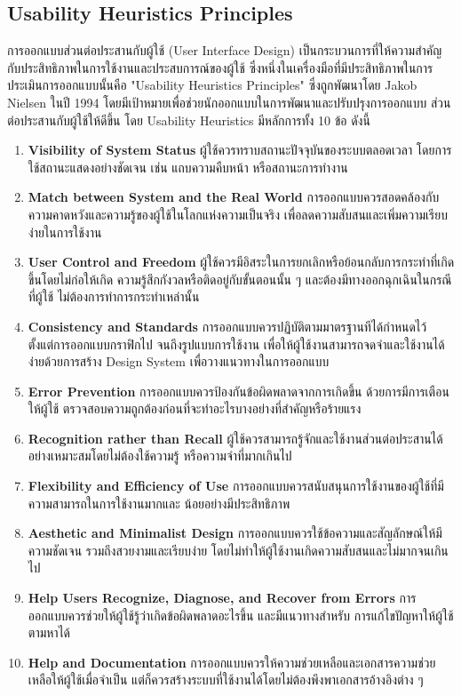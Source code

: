 \subsection{Usability Heuristics Principles}
การออกแบบส่วนต่อประสานกับผู้ใช้ (User Interface Design) 
เป็นกระบวนการที่ให้ความสำคัญกับประสิทธิภาพในการใช้งานและประสบการณ์ของผู้ใช้ 
ซึ่งหนึ่งในเครื่องมือที่มีประสิทธิภาพในการประเมินการออกแบบนั้นคือ 
"Usability Heuristics Principles" ซึ่งถูกพัฒนาโดย Jakob Nielsen  
ในปี 1994 โดยมีเป้าหมายเพื่อช่วยนักออกแบบในการพัฒนาและปรับปรุงการออกแบบ
ส่วนต่อประสานกับผู้ใช้ให้ดีขึ้น โดย Usability Heuristics มีหลักการทั้ง 10 ข้อ ดังนี้
\begin{enumerate}
    \item \textbf{Visibility of System Status} 
    ผู้ใช้ควรทราบสถานะปัจจุบันของระบบตลอดเวลา โดยการใช้สถานะแสดงอย่างชัดเจน 
    เช่น แถบความคืบหน้า หรือสถานะการทำงาน
    \item \textbf{Match between System and the Real World} 
    การออกแบบควรสอดคล้องกับความคาดหวังและความรู้ของผู้ใช้ในโลกแห่งความเป็นจริง 
    เพื่อลดความสับสนและเพิ่มความเรียบง่ายในการใช้งาน
    \item \textbf{User Control and Freedom} 
    ผู้ใช้ควรมีอิสระในการยกเลิกหรือย้อนกลับการกระทำที่เกิดขึ้นโดยไม่ก่อให้เกิด
    ความรู้สึกกังวลหรือติดอยู่กับขั้นตอนนั้น ๆ  และต้องมีทางออกฉุกเฉินในกรณีที่ผู้ใช้
    ไม่ต้องการทำการกระทำเหล่านั้น
    \item \textbf{Consistency and Standards} 
    การออกแบบควรปฏิบัติตามมาตรฐานทีได้กำหนดไว้ ตั้งแต่การออกแบบกราฟิกไป
    จนถึงรูปแบบการใช้งาน เพื่อให้ผู้ใช้งานสามารถจดจำและใช้งานได้ง่ายด้วยการสร้าง 
    Design System เพื่อวางแนวทางในการออกแบบ
    \item \textbf{Error Prevention} 
    การออกแบบควรป้องกันข้อผิดพลาดจากการเกิดขึ้น ด้วยการมีการเตือนให้ผู้ใช้
    ตรวจสอบความถูกต้องก่อนที่จะทำอะไรบางอย่างที่สำคัญหรือร้ายแรง
    \item \textbf{Recognition rather than Recall} 
    ผู้ใช้ควรสามารถรู้จักและใช้งานส่วนต่อประสานได้อย่างเหมาะสมโดยไม่ต้องใช้ความรู้
    หรือความจำที่มากเกินไป
    \item \textbf{Flexibility and Efficiency of Use} 
    การออกแบบควรสนับสนุนการใช้งานของผู้ใช้ที่มีความสามารถในการใช้งานมากและ
    น้อยอย่างมีประสิทธิภาพ
    \item \textbf{Aesthetic and Minimalist Design} 
    การออกแบบควรใช้ข้อความและสัญลักษณ์ให้มีความชัดเจน รวมถึงสวยงามและเรียบง่าย 
    โดยไม่ทำให้ผู้ใช้งานเกิดความสับสนและไม่มากจนเกินไป
    \item \textbf{Help Users Recognize, Diagnose, and Recover from Errors} 
    การออกแบบควรช่วยให้ผู้ใช้รู้ว่าเกิดข้อผิดพลาดอะไรขึ้น และมีแนวทางสำหรับ
    การแก้ไขปัญหาให้ผู้ใช้ตามหาได้
    \item \textbf{Help and Documentation} 
    การออกแบบควรให้ความช่วยเหลือและเอกสารความช่วยเหลือให้ผู้ใช้เมื่อจำเป็น 
    แต่ก็ควรสร้างระบบที่ใช้งานได้โดยไม่ต้องพึงพาเอกสารอ้างอิงต่าง ๆ
\end{enumerate}
